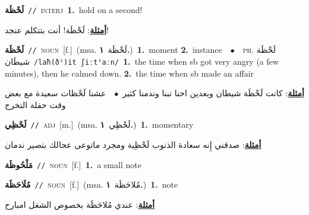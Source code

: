 \documentclass[10pt,a4paper,twoside]{article} %
\begin{document}
\begin{multicols}{2}
{\setlength\topsep{0pt}\textbf{\foreignlanguage{arabic}{لَحْظَة}}\ {\color{gray}\texttt{//}\color{black}}\ \textsc{interj}\ \textbf{1.}~hold on a second!\  \begin{flushright}\color{gray}\foreignlanguage{arabic}{\textbf{\underline{\foreignlanguage{arabic}{أمثلة}}}: لَحْظَة! أنت بتتكلم عنجد!}\end{flushright}\color{black}} \vspace{2mm}

{\setlength\topsep{0pt}\textbf{\foreignlanguage{arabic}{لَحْظَة}}\ {\color{gray}\texttt{//}\color{black}}\ \textsc{noun}\ [f.]\ \color{gray}(msa. \foreignlanguage{arabic}{لَحْظَة}~\foreignlanguage{arabic}{\textbf{١.}})\color{black}\ \textbf{1.}~moment  \textbf{2.}~instance\ \ $\bullet$\ \ \textsc{ph.} \color{gray} \foreignlanguage{arabic}{لَحْظَة شيطَان}\color{black}\ {\color{gray}\texttt{/{\sffamily laħ(ðˤ)it ʃiːtˤaːn}/}\color{black}}\ \textbf{1.}~the time when sb got very angry (a few minutes), then he calmed down.  \textbf{2.}~the time when sb made an affair\  \begin{flushright}\color{gray}\foreignlanguage{arabic}{\textbf{\underline{\foreignlanguage{arabic}{أمثلة}}}: كانت لَحْظَة شيطان وبعدين احنا تبنا وندمنا كثير\ $\bullet$\ \  عشنا لَحْظات سعيدة مع بعض وقت حفلة التخرج}\end{flushright}\color{black}} \vspace{2mm}

{\setlength\topsep{0pt}\textbf{\foreignlanguage{arabic}{لَحْظِي}}\ {\color{gray}\texttt{//}\color{black}}\ \textsc{adj}\ [m.]\ \color{gray}(msa. \foreignlanguage{arabic}{لَحْظِي}~\foreignlanguage{arabic}{\textbf{١.}})\color{black}\ \textbf{1.}~momentary\  \begin{flushright}\color{gray}\foreignlanguage{arabic}{\textbf{\underline{\foreignlanguage{arabic}{أمثلة}}}: صدقني إِنه سعادة الذنوب لَحْظِية ومجرد ماتوعى عحالك بتصير ندمان}\end{flushright}\color{black}} \vspace{2mm}

{\setlength\topsep{0pt}\textbf{\foreignlanguage{arabic}{مَلْحُوظَة}}\ {\color{gray}\texttt{//}\color{black}}\ \textsc{noun}\ [f.]\ \textbf{1.}~a small note\ } \vspace{2mm}

{\setlength\topsep{0pt}\textbf{\foreignlanguage{arabic}{مُلَاحَظَة}}\ {\color{gray}\texttt{//}\color{black}}\ \textsc{noun}\ [f.]\ \color{gray}(msa. \foreignlanguage{arabic}{مُلاحَظَة}~\foreignlanguage{arabic}{\textbf{١.}})\color{black}\ \textbf{1.}~note\  \begin{flushright}\color{gray}\foreignlanguage{arabic}{\textbf{\underline{\foreignlanguage{arabic}{أمثلة}}}: عندي مُلاحَظَة بخصوص الشغل امبارح}\end{flushright}\color{black}} \vspace{2mm}


\end{multicols}
\end{document}
